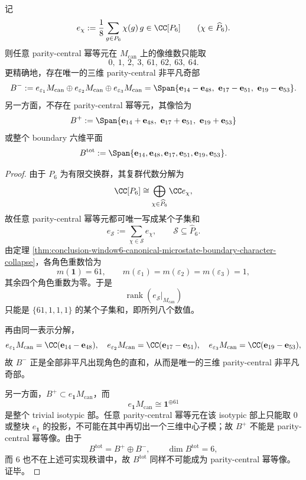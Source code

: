 \begin{proposition}\label{prop:conclusion-window6-parity-central-rank-spectrum}
记
\[
e_{\chi}:=\frac18\sum_{g\in P_6}\chi(g)\,g\in \CC[P_6]
\qquad (\chi\in \widehat P_6).
\]
则任意 parity-central 幂等元在 \(M_{\mathrm{can}}\) 上的像维数只能取
\[
0,\ 1,\ 2,\ 3,\ 61,\ 62,\ 63,\ 64.
\]
更精确地，存在唯一的三维 parity-central 非平凡奇部
\[
B^-:=e_{\varepsilon_1}M_{\mathrm{can}}
\oplus e_{\varepsilon_2}M_{\mathrm{can}}
\oplus e_{\varepsilon_3}M_{\mathrm{can}}
=
\Span\{
\mathbf e_{14}-\mathbf e_{48},\
\mathbf e_{17}-\mathbf e_{51},\
\mathbf e_{19}-\mathbf e_{53}
\}.
\]
另一方面，不存在 parity-central 幂等元，其像恰为
\[
B^+:=
\Span\{
\mathbf e_{14}+\mathbf e_{48},\
\mathbf e_{17}+\mathbf e_{51},\
\mathbf e_{19}+\mathbf e_{53}
\}
\]
或整个 boundary 六维平面
\[
B^{\mathrm{tot}}
:=
\Span\{
\mathbf e_{14},\mathbf e_{48},
\mathbf e_{17},\mathbf e_{51},
\mathbf e_{19},\mathbf e_{53}
\}.
\]
\end{proposition}
\begin{proof}
由于 \(P_6\) 为有限交换群，其复群代数分解为
\[
\CC[P_6]\cong \bigoplus_{\chi\in\widehat P_6}\CC e_{\chi},
\]
故任意 parity-central 幂等元都可唯一写成某个子集和
\[
e_{\mathcal S}:=\sum_{\chi\in\mathcal S}e_{\chi},
\qquad
\mathcal S\subseteq \widehat P_6.
\]
由定理 \ref{thm:conclusion-window6-canonical-microstate-boundary-character-collapse}，各角色重数恰为
\[
m(\mathbf 1)=61,
\qquad
m(\varepsilon_1)=m(\varepsilon_2)=m(\varepsilon_3)=1,
\]
其余四个角色重数为零。于是
\[
\operatorname{rank}(e_{\mathcal S}|_{M_{\mathrm{can}}})
\]
只能是 \(\{61,1,1,1\}\) 的某个子集和，即所列八个数值。

再由同一表示分解，
\[
e_{\varepsilon_1}M_{\mathrm{can}}
=
\CC(\mathbf e_{14}-\mathbf e_{48}),
\quad
e_{\varepsilon_2}M_{\mathrm{can}}
=
\CC(\mathbf e_{17}-\mathbf e_{51}),
\quad
e_{\varepsilon_3}M_{\mathrm{can}}
=
\CC(\mathbf e_{19}-\mathbf e_{53}),
\]
故 \(B^-\) 正是全部非平凡出现角色的直和，从而是唯一的三维 parity-central 非平凡奇部。

另一方面，\(B^+\subset e_{\mathbf 1}M_{\mathrm{can}}\)，而
\[
e_{\mathbf 1}M_{\mathrm{can}}\cong \mathbf 1^{\oplus 61}
\]
是整个 trivial isotypic 部。任意 parity-central 幂等元在该 isotypic 部上只能取 \(0\) 或整块 \(e_{\mathbf 1}\) 的投影，不可能在其中再切出一个三维中心子模；故 \(B^+\) 不能是 parity-central 幂等像。由于
\[
B^{\mathrm{tot}}=B^+\oplus B^-,
\qquad
\dim B^{\mathrm{tot}}=6,
\]
而 \(6\) 也不在上述可实现秩谱中，故 \(B^{\mathrm{tot}}\) 同样不可能成为 parity-central 幂等像。证毕。
\end{proof}

